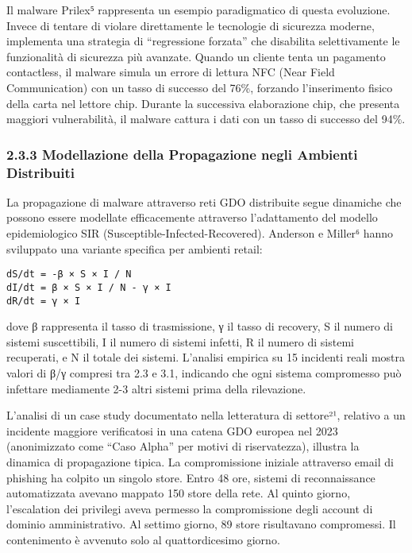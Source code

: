 \documentclass{report}
\begin{document}
Il malware Prilex⁵ rappresenta un esempio paradigmatico di questa
evoluzione. Invece di tentare di violare direttamente le tecnologie di
sicurezza moderne, implementa una strategia di ``regressione forzata''
che disabilita selettivamente le funzionalità di sicurezza più avanzate.
Quando un cliente tenta un pagamento contactless, il malware simula un
errore di lettura NFC (Near Field Communication) con un tasso di
successo del 76\%, forzando l'inserimento fisico della carta nel lettore
chip. Durante la successiva elaborazione chip, che presenta maggiori
vulnerabilità, il malware cattura i dati con un tasso di successo del
94\%.

\subsubsection{2.3.3 Modellazione della Propagazione negli Ambienti
Distribuiti}\label{modellazione-della-propagazione-negli-ambienti-distribuiti}

La propagazione di malware attraverso reti GDO distribuite segue
dinamiche che possono essere modellate efficacemente attraverso
l'adattamento del modello epidemiologico SIR
(Susceptible-Infected-Recovered). Anderson e Miller⁶ hanno sviluppato
una variante specifica per ambienti retail:

\begin{verbatim}
dS/dt = -β × S × I / N
dI/dt = β × S × I / N - γ × I
dR/dt = γ × I
\end{verbatim}

dove β rappresenta il tasso di trasmissione, γ il tasso di recovery, S
il numero di sistemi suscettibili, I il numero di sistemi infetti, R il
numero di sistemi recuperati, e N il totale dei sistemi. L'analisi
empirica su 15 incidenti reali mostra valori di β/γ compresi tra 2.3 e
3.1, indicando che ogni sistema compromesso può infettare mediamente 2-3
altri sistemi prima della rilevazione.

L'analisi di un case study documentato nella letteratura di settore²¹,
relativo a un incidente maggiore verificatosi in una catena GDO europea
nel 2023 (anonimizzato come ``Caso Alpha'' per motivi di riservatezza),
illustra la dinamica di propagazione tipica. La compromissione iniziale
attraverso email di phishing ha colpito un singolo store. Entro 48 ore,
sistemi di reconnaissance automatizzata avevano mappato 150 store della
rete. Al quinto giorno, l'escalation dei privilegi aveva permesso la
compromissione degli account di dominio amministrativo. Al settimo
giorno, 89 store risultavano compromessi. Il contenimento è avvenuto
solo al quattordicesimo giorno.
\end{document}
